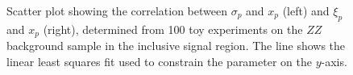 \begin{figure}[htbp]
    \centering
	\caption{Scatter plot showing the correlation between $\sigma_p$ and $x_p$ (left) and $\xi_p$ and $x_p$ (right), determined from 100 toy experiments on the $ZZ$ background sample in the inclusive signal region. The line shows the linear least squares fit used to constrain the parameter on the $y$-axis.}
	\label{fig:resonance-bukin-reduction-ZZ}
\end{figure}


